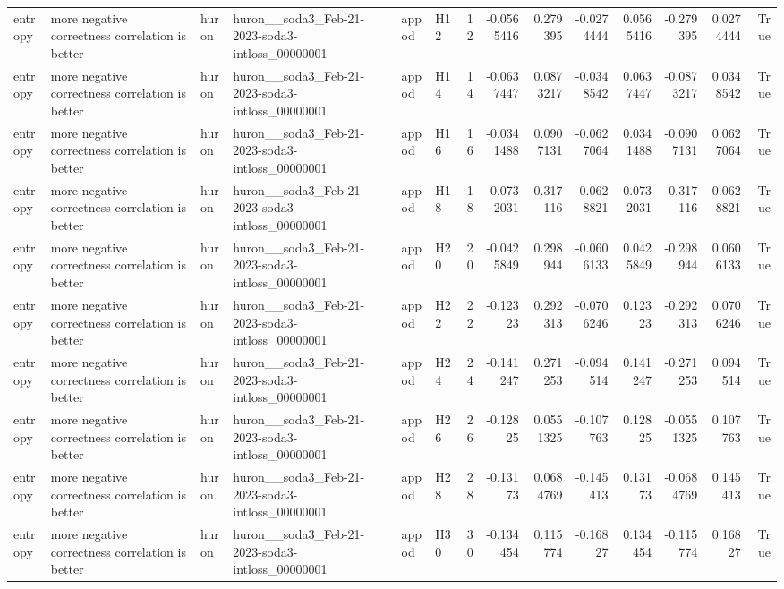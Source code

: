 \begin{longtable}{llllllrrrrrrrr}
entropy & more negative correctness correlation is better & huron & huron\_\_soda3\_Feb-21-2023-soda3-intloss\_00000001 & appod & H12 & 12 & -0.0565416 & 0.279395 & -0.0274444 & 0.0565416 & -0.279395 & 0.0274444 & True \\
entropy & more negative correctness correlation is better & huron & huron\_\_soda3\_Feb-21-2023-soda3-intloss\_00000001 & appod & H14 & 14 & -0.0637447 & 0.0873217 & -0.0348542 & 0.0637447 & -0.0873217 & 0.0348542 & True \\
entropy & more negative correctness correlation is better & huron & huron\_\_soda3\_Feb-21-2023-soda3-intloss\_00000001 & appod & H16 & 16 & -0.0341488 & 0.0907131 & -0.0627064 & 0.0341488 & -0.0907131 & 0.0627064 & True \\
entropy & more negative correctness correlation is better & huron & huron\_\_soda3\_Feb-21-2023-soda3-intloss\_00000001 & appod & H18 & 18 & -0.0732031 & 0.317116 & -0.0628821 & 0.0732031 & -0.317116 & 0.0628821 & True \\
entropy & more negative correctness correlation is better & huron & huron\_\_soda3\_Feb-21-2023-soda3-intloss\_00000001 & appod & H20 & 20 & -0.0425849 & 0.298944 & -0.0606133 & 0.0425849 & -0.298944 & 0.0606133 & True \\
entropy & more negative correctness correlation is better & huron & huron\_\_soda3\_Feb-21-2023-soda3-intloss\_00000001 & appod & H22 & 22 & -0.12323 & 0.292313 & -0.0706246 & 0.12323 & -0.292313 & 0.0706246 & True \\
entropy & more negative correctness correlation is better & huron & huron\_\_soda3\_Feb-21-2023-soda3-intloss\_00000001 & appod & H24 & 24 & -0.141247 & 0.271253 & -0.094514 & 0.141247 & -0.271253 & 0.094514 & True \\
entropy & more negative correctness correlation is better & huron & huron\_\_soda3\_Feb-21-2023-soda3-intloss\_00000001 & appod & H26 & 26 & -0.12825 & 0.0551325 & -0.107763 & 0.12825 & -0.0551325 & 0.107763 & True \\
entropy & more negative correctness correlation is better & huron & huron\_\_soda3\_Feb-21-2023-soda3-intloss\_00000001 & appod & H28 & 28 & -0.13173 & 0.0684769 & -0.145413 & 0.13173 & -0.0684769 & 0.145413 & True \\
entropy & more negative correctness correlation is better & huron & huron\_\_soda3\_Feb-21-2023-soda3-intloss\_00000001 & appod & H30 & 30 & -0.134454 & 0.115774 & -0.16827 & 0.134454 & -0.115774 & 0.16827 & True \\

\end{longtable}
